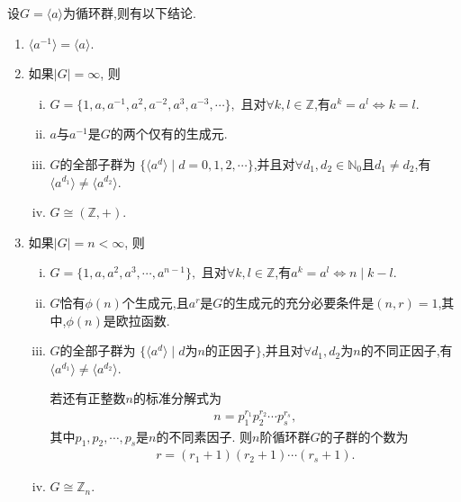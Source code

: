 \documentclass[../../main.tex]{subfiles}%
\begin{document}
\begin{theorem}\label{theorem:有限和无限循环群的常用结论}
设$G = \langle a \rangle$为循环群,则有以下结论.
\begin{enumerate}[(1)]
\item\label{theorem:有限和无限循环群的常用结论-0} $\langle a^{-1} \rangle = \langle a \rangle$.

\item\label{theorem:有限和无限循环群的常用结论-1} 如果$|G| = \infty$, 则
\begin{enumerate}[(i)]
\item\label{theorem:有限和无限循环群的常用结论-1-0} $G = \{1, a, a^{-1}, a^2, a^{-2}, a^3, a^{-3}, \cdots\},$
且对$\forall k,l \in \mathbb{Z}$,有$a^k = a^l\iff k = l$.

\item\label{theorem:有限和无限循环群的常用结论-1-1} $a$与$a^{-1}$是$G$的两个仅有的生成元.

\item\label{theorem:有限和无限循环群的常用结论-1-2} $G$的全部子群为
$\{\langle a^d \rangle \mid d = 0,1,2,\cdots\}$,并且对$\forall d_1,d_2\in \mathbb{N}_0\text{且}d_1\neq d_2$,有$\langle a^{d_1} \rangle \neq \langle a^{d_2} \rangle$.

\item\label{theorem:有限和无限循环群的常用结论-1-3} $G\cong (\mathbb{Z},+)$.
\end{enumerate}

\item\label{theorem:有限和无限循环群的常用结论-2} 如果$|G| = n<\infty$, 则
\begin{enumerate}[(i)]
\item\label{theorem:有限和无限循环群的常用结论-2-0} $G = \{1, a, a^2, a^3, \cdots, a^{n-1}\},$
且对$\forall k,l \in \mathbb{Z}$,有$a^k = a^l \iff n \mid k - l.$

\item\label{theorem:有限和无限循环群的常用结论-2-1} $G$恰有$\phi(n)$个生成元,且$a^r$是$G$的生成元的充分必要条件是$(n,r)=1$,其中,$\phi(n)$是欧拉函数.

\item\label{theorem:有限和无限循环群的常用结论-2-2} $G$的全部子群为
$\{\langle a^d \rangle \mid d$为$n$的正因子$\}$,并且对$\forall d_1,d_2$为$n$的不同正因子,有$\langle a^{d_1} \rangle \neq \langle a^{d_2} \rangle$.

若还有正整数$n$的标准分解式为
\begin{align*}
n = p_1^{r_1}p_2^{r_2}\cdots p_s^{r_s},
\end{align*}
其中$p_1,p_2,\cdots,p_s$是$n$的不同素因子. 则$n$阶循环群$G$的子群的个数为
\begin{align*}
r = (r_1 + 1)(r_2 + 1)\cdots(r_s + 1).
\end{align*}

\item\label{theorem:有限和无限循环群的常用结论-2-3} $G\cong \mathbb{Z}_n$.
\end{enumerate}
\end{enumerate}
\end{theorem}
\end{document}

